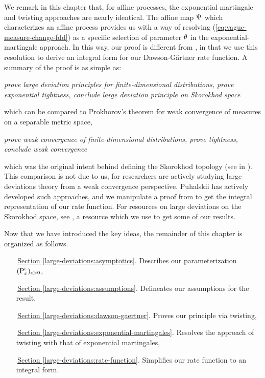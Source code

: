 We remark in this chapter that, for affine processes, the exponential martingale and twisting approaches are nearly identical.
The affine map $\Psi$ which characterizes an affine process provides us with a way of resolving (\ref{eq:vague-measure-change-fdd}) as a specific selection of parameter $\theta$ in the exponential-martingale approach.
In this way, our proof is different from \cite{kang2014}, in that we use this resolution to derive an integral form for our Dawson-G\"artner rate function.
A summary of the proof is as simple as:
\begin{center}
  \itshape
  prove large deviation principles for finite-dimensional distributions, prove exponential tightness, conclude large deviation principle on Skorokhod space
\end{center}
which can be compared to Prokhorov's theorem for weak convergence of measures on a separable metric space,
\begin{center}
  \itshape
  prove weak convergence of finite-dimensional distributions, prove tightness, conclude weak convergence
\end{center}
which was the original intent behind defining the Skorokhod topology (see in \cite{skorokhod1956}).
This comparison is not due to us, for researchers are actively studying large deviations theory from a weak convergence perspective.
Puhalskii has actively developed such approaches, and we manipulate a proof from \cite{puhalskii2001} to get the integral representation of our rate function.
For resources on large deviations on the Skorokhod space, see \cite{feng2006}, a resource which we use to get some of our results.

Now that we have introduced the key ideas, the remainder of this chapter is organized as follows.
\begin{enumerate}[leftmargin=24mm]
  \item[\,{\hyperref[large-deviations:asymptotics]{Section }}\ref{large-deviations:asymptotics}.]
    Describes our parameterization $({\operatorname{P}}^\epsilon_x)_{\epsilon>0}$, 
  \item[\,{\hyperref[large-deviations:assumptions]{Section }}\ref{large-deviations:assumptions}.]
    Delineates our assumptions for the result,
  \item[\,{\hyperref[large-deviations:dawson-gaertner]{Section }}\ref{large-deviations:dawson-gaertner}.]
    Proves our principle via twisting,
  \item[\,{\hyperref[large-deviations:exponential-martingales]{Section }}\ref{large-deviations:exponential-martingales}.]
    Resolves the approach of twisting with that of exponential martingales,
  \item[\,{\hyperref[large-deviations:rate-function]{Section }}\ref{large-deviations:rate-function}.]
    Simplifies our rate function to an integral form.
\end{enumerate}
